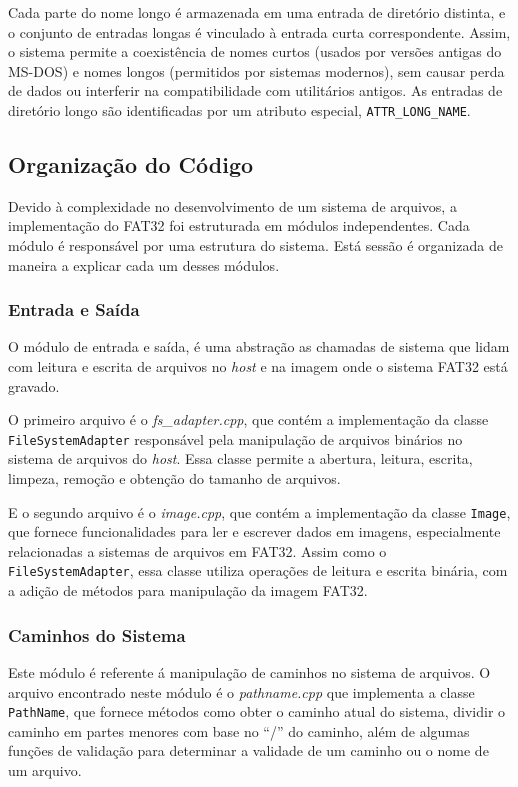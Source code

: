 \documentclass[
    12pt,				%
    oneside,   	        %
    a4paper,			%
    english,			%
    french,				%
    spanish,			%
    brazil,				%
    ]{pacotes/abntex2}
\begin{document}
Cada parte do nome longo é armazenada em uma entrada de diretório distinta, e o conjunto de entradas longas é vinculado à entrada curta correspondente. Assim, o sistema permite a coexistência de nomes curtos (usados por versões antigas do MS-DOS) e nomes longos (permitidos por sistemas modernos), sem causar perda de dados ou interferir na compatibilidade com utilitários antigos. As entradas de diretório longo são identificadas por um atributo especial, \texttt{ATTR\_LONG\_NAME}.

\subsection{Organização do Código}
\label{subsubsec:code}

Devido à complexidade no desenvolvimento de um sistema de arquivos, a implementação do FAT32 foi estruturada em módulos independentes. Cada módulo é responsável por uma estrutura do sistema. Está sessão é organizada de maneira a explicar cada um desses módulos.

\subsubsection{Entrada e Saída}
\label{subsubsec:io}

O módulo de entrada e saída, é uma abstração as chamadas de sistema que lidam com leitura e escrita de arquivos no \textit{host} e na imagem onde o sistema FAT32 está gravado.

O primeiro arquivo é o \textit{fs\_adapter.cpp}, que contém a implementação da classe \texttt{FileSystemAdapter} responsável pela manipulação de arquivos binários no sistema de arquivos do \textit{host}. Essa classe permite a abertura, leitura, escrita, limpeza, remoção e obtenção do tamanho de arquivos.

E o segundo arquivo é o \textit{image.cpp}, que contém a implementação da classe \texttt{Image}, que fornece funcionalidades para ler e escrever dados em imagens, especialmente relacionadas a sistemas de arquivos em FAT32. Assim como o \texttt{FileSystemAdapter}, essa classe utiliza operações de leitura e escrita binária, com a adição de métodos para manipulação da imagem FAT32.

\subsubsection{Caminhos do Sistema}
\label{subsubsec:parser}

Este módulo é referente á manipulação de caminhos no sistema de arquivos. O arquivo encontrado neste módulo é o \textit{pathname.cpp} que implementa a classe \texttt{PathName}, que fornece métodos como obter o caminho atual do sistema, dividir o caminho em partes menores com base no ``/'' do caminho, além de algumas funções de validação para determinar a validade de um caminho ou o nome de um arquivo.  
\end{document}
